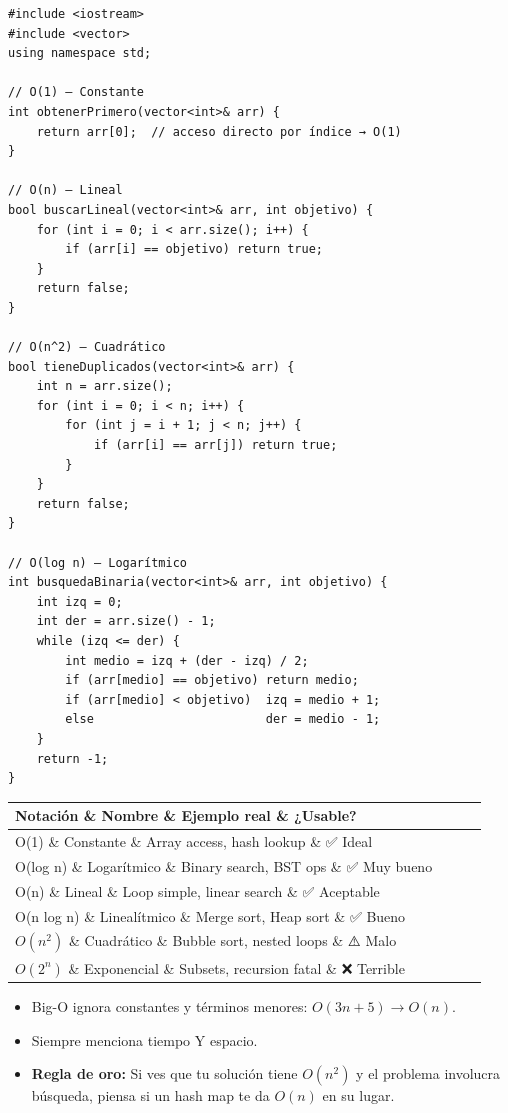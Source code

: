 \begin{lstlisting}
#include <iostream>
#include <vector>
using namespace std;

// O(1) — Constante
int obtenerPrimero(vector<int>& arr) {
    return arr[0];  // acceso directo por índice → O(1)
}

// O(n) — Lineal
bool buscarLineal(vector<int>& arr, int objetivo) {
    for (int i = 0; i < arr.size(); i++) {
        if (arr[i] == objetivo) return true;
    }
    return false;
}

// O(n^2) — Cuadrático
bool tieneDuplicados(vector<int>& arr) {
    int n = arr.size();
    for (int i = 0; i < n; i++) {
        for (int j = i + 1; j < n; j++) {
            if (arr[i] == arr[j]) return true;
        }
    }
    return false;
}

// O(log n) — Logarítmico
int busquedaBinaria(vector<int>& arr, int objetivo) {
    int izq = 0;
    int der = arr.size() - 1;
    while (izq <= der) {
        int medio = izq + (der - izq) / 2;
        if (arr[medio] == objetivo) return medio;
        if (arr[medio] < objetivo)  izq = medio + 1;
        else                        der = medio - 1;
    }
    return -1;
}
\end{lstlisting}

\begin{dsacomplejidad}

\begin{tabular}{|l|l|l|l|}
\hline
Notación \& Nombre \& Ejemplo real \& ¿Usable? \\
\hline
O(1) \& Constante \& Array access, hash lookup \& ✅ Ideal \\
O(log n) \& Logarítmico \& Binary search, BST ops \& ✅ Muy bueno \\
O(n) \& Lineal \& Loop simple, linear search \& ✅ Aceptable \\
O(n log n) \& Linealítmico \& Merge sort, Heap sort \& ✅ Bueno \\
$O(n^2)$ \& Cuadrático \& Bubble sort, nested loops \& ⚠️ Malo \\
$O(2^n)$ \& Exponencial \& Subsets, recursion fatal \& ❌ Terrible \\
\hline
\end{tabular}

\end{dsacomplejidad}

\begin{dsaentrevistas}

\begin{itemize}
    \item Big-O ignora constantes y términos menores: $O(3n + 5) \rightarrow O(n)$.
    \item Siempre menciona tiempo Y espacio.
    \item \textbf{Regla de oro:} Si ves que tu solución tiene $O(n^2)$ y el problema involucra búsqueda, piensa si un hash map te da $O(n)$ en su lugar.
\end{itemize}

\end{dsaentrevistas}

